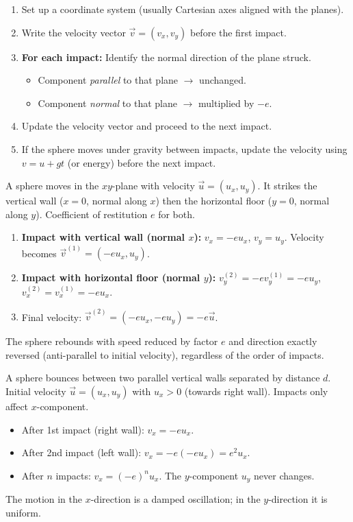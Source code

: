 \documentclass[11pt]{article}
\begin{document}
\begin{methode}
\begin{enumerate}
    \item Set up a coordinate system (usually Cartesian axes aligned with the planes).
    \item Write the velocity vector $\vec{v} = (v_x, v_y)$ before the first impact.
    \item \textbf{For each impact:} Identify the normal direction of the plane struck.
    \begin{itemize}
        \item Component \emph{parallel} to that plane $\to$ unchanged.
        \item Component \emph{normal} to that plane $\to$ multiplied by $-e$.
    \end{itemize}
    \item Update the velocity vector and proceed to the next impact.
    \item If the sphere moves under gravity between impacts, update the velocity using $v = u + gt$ (or energy) before the next impact.
\end{enumerate}
\end{methode}

\begin{exemplebox}
A sphere moves in the $xy$-plane with velocity $\vec{u} = (u_x, u_y)$. It strikes the vertical wall ($x=0$, normal along $x$) then the horizontal floor ($y=0$, normal along $y$). Coefficient of restitution $e$ for both.
\begin{enumerate}
    \item \textbf{Impact with vertical wall (normal $x$):} $v_x = -e u_x$, $v_y = u_y$. Velocity becomes $\vec{v}^{(1)} = (-e u_x, u_y)$.
    \item \textbf{Impact with horizontal floor (normal $y$):} $v_y^{(2)} = -e v_y^{(1)} = -e u_y$, $v_x^{(2)} = v_x^{(1)} = -e u_x$.
    \item Final velocity: $\vec{v}^{(2)} = (-e u_x, -e u_y) = -e \vec{u}$.
\end{enumerate}
The sphere rebounds with speed reduced by factor $e$ and direction exactly reversed (anti-parallel to initial velocity), regardless of the order of impacts.
\end{exemplebox}

\begin{exemplebox}
A sphere bounces between two parallel vertical walls separated by distance $d$. Initial velocity $\vec{u} = (u_x, u_y)$ with $u_x > 0$ (towards right wall). Impacts only affect $x$-component.
\begin{itemize}
    \item After 1st impact (right wall): $v_x = -e u_x$.
    \item After 2nd impact (left wall): $v_x = -e(-e u_x) = e^2 u_x$.
    \item After $n$ impacts: $v_x = (-e)^n u_x$. The $y$-component $u_y$ never changes.
\end{itemize}
The motion in the $x$-direction is a damped oscillation; in the $y$-direction it is uniform.
\end{exemplebox}
\end{document}
